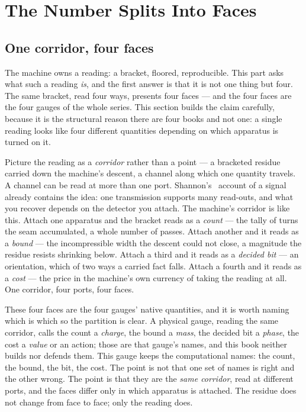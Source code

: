 \chapter{The Number Splits Into Faces}

\section{One corridor, four faces}

The machine owns a reading: a bracket, floored, reproducible. This part asks what such a reading \emph{is}, and the
first answer is that it is not one thing but four. The same bracket, read four ways, presents four faces --- and the four
faces are the four gauges of the whole series. This section builds the claim carefully, because it is the structural
reason there are four books and not one: a single reading looks like four different quantities depending on which
apparatus is turned on it.

Picture the reading as a \emph{corridor} rather than a point --- a bracketed residue carried down the machine's descent,
a channel along which one quantity travels. A channel can be read at more than one port. Shannon's~\cite{shannon1948}
account of a signal already contains the idea: one transmission supports many read-outs, and what you recover depends on
the detector you attach. The machine's corridor is like this. Attach one apparatus and the bracket reads as a
\emph{count} --- the tally of turns the seam accumulated, a whole number of passes. Attach another and it reads as a
\emph{bound} --- the incompressible width the descent could not close, a magnitude the residue resists shrinking below.
Attach a third and it reads as a \emph{decided bit} --- an orientation, which of two ways a carried fact falls. Attach a
fourth and it reads as a \emph{cost} --- the price in the machine's own currency of taking the reading at all. One
corridor, four ports, four faces.

These four faces are the four gauges' native quantities, and it is worth naming which is which so the partition is
clear. A physical gauge, reading the same corridor, calls the count a \emph{charge}, the bound a \emph{mass}, the
decided bit a \emph{phase}, the cost a \emph{value} or an action; those are that gauge's names, and this book neither
builds nor defends them. This gauge keeps the computational names: the count, the bound, the bit, the cost. The point is
not that one set of names is right and the other wrong. The point is that they are the \emph{same corridor}, read at
different ports, and the faces differ only in which apparatus is attached. The residue does not change from face to
face; only the reading does.

